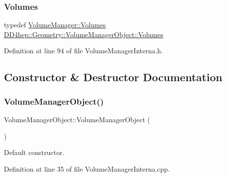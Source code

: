 \subsubsection{\texorpdfstring{Volumes}{Volumes}}
{\footnotesize\ttfamily typedef \hyperlink{class_d_d4hep_1_1_geometry_1_1_volume_manager_a81625fd63b37636f0b4019b102aba787}{Volume\+Manager\+::\+Volumes} \hyperlink{class_d_d4hep_1_1_geometry_1_1_volume_manager_object_a6bbeb958237bc33c7228abada088f6a1}{D\+D4hep\+::\+Geometry\+::\+Volume\+Manager\+Object\+::\+Volumes}}



Definition at line 94 of file Volume\+Manager\+Interna.\+h.



\subsection{Constructor \& Destructor Documentation}
\hypertarget{class_d_d4hep_1_1_geometry_1_1_volume_manager_object_ab52b36882ffec6a6b6023ae93f3d19bd}{}\label{class_d_d4hep_1_1_geometry_1_1_volume_manager_object_ab52b36882ffec6a6b6023ae93f3d19bd} 
\subsubsection{\texorpdfstring{Volume\+Manager\+Object()}{VolumeManagerObject()}}
{\footnotesize\ttfamily Volume\+Manager\+Object\+::\+Volume\+Manager\+Object (\begin{DoxyParamCaption}{ }\end{DoxyParamCaption})}



Default constructor. 



Definition at line 35 of file Volume\+Manager\+Interna.\+cpp.

\hypertarget{class_d_d4hep_1_1_geometry_1_1_volume_manager_object_a9c8a75f018315e09a2d5180cacd45468}{}\label{class_d_d4hep_1_1_geometry_1_1_volume_manager_object_a9c8a75f018315e09a2d5180cacd45468} 
